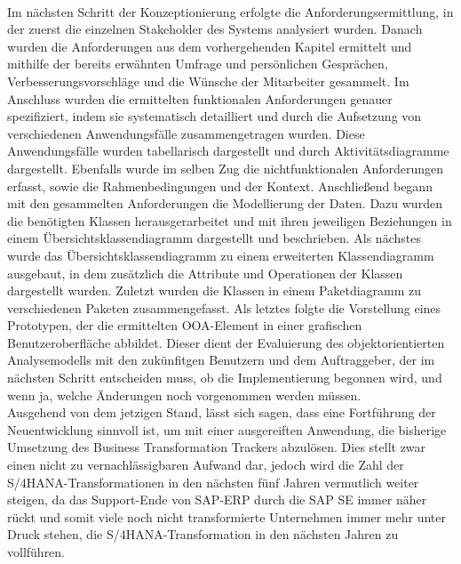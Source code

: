 \\Im nächsten Schritt der Konzeptionierung erfolgte die Anforderungsermittlung, in der zuerst die einzelnen Stakeholder des Systems analysiert wurden. Danach wurden die Anforderungen aus dem vorhergehenden Kapitel ermittelt und mithilfe der bereits erwähnten Umfrage und persönlichen Gesprächen, Verbesserungsvorschläge und die Wünsche der Mitarbeiter gesammelt. Im Anschluss wurden die ermittelten funktionalen Anforderungen genauer spezifiziert, indem sie systematisch detailliert und durch die Aufsetzung von verschiedenen Anwendungsfälle zusammengetragen wurden. Diese Anwendungsfälle wurden tabellarisch dargestellt und durch Aktivitätsdiagramme dargestellt. Ebenfalls wurde im selben Zug die nichtfunktionalen Anforderungen erfasst, sowie die Rahmenbedingungen und der Kontext. Anschließend begann mit den gesammelten Anforderungen die Modellierung der Daten. Dazu wurden die benötigten Klassen herausgerarbeitet und mit ihren jeweiligen Beziehungen in einem Übersichtsklassendiagramm dargestellt und beschrieben. Als nächstes wurde das Übersichtsklassendiagramm zu einem erweiterten Klassendiagramm ausgebaut, in dem zusätzlich die Attribute und Operationen der Klassen dargestellt wurden. Zuletzt wurden die Klassen in einem Paketdiagramm zu verschiedenen Paketen zusammengefasst.
Als letztes folgte die Vorstellung eines Prototypen, der die ermittelten OOA-Element in einer grafischen Benutzeroberfläche abbildet. Dieser dient der Evaluierung des objektorientierten Analysemodells mit den zukünfitgen Benutzern und dem Auftraggeber, der im nächsten Schritt entscheiden muss, ob die Implementierung begonnen wird, und wenn ja, welche Änderungen noch vorgenommen werden müssen.\\
Ausgehend von dem jetzigen Stand, lässt sich sagen, dass eine Fortführung der Neuentwicklung sinnvoll ist, um mit einer ausgereiften Anwendung, die bisherige Umsetzung des Business Transformation Trackers abzulösen. Dies stellt zwar einen nicht zu vernachlässigbaren Aufwand dar, jedoch wird die Zahl der S/4HANA-Transformationen in den nächsten fünf Jahren vermutlich weiter steigen, da das Support-Ende von SAP-ERP durch die SAP SE immer näher rückt und somit viele noch nicht transformierte Unternehmen immer mehr unter Druck stehen, die S/4HANA-Transformation in den nächsten Jahren zu vollführen.